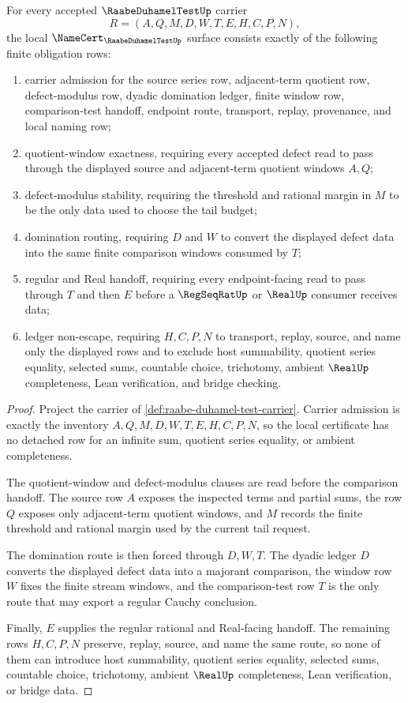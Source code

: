 \begin{theorem}\label{thm:raabe-duhamel-test-namecert-obligations}
For every accepted $\RaabeDuhamelTestUp$ carrier
$$
R=(A,Q,M,D,W,T,E,H,C,P,N),
$$
the local $\NameCert_{\RaabeDuhamelTestUp}$ surface consists exactly of the following finite obligation rows:
\begin{enumerate}
\item carrier admission for the source series row, adjacent-term quotient row, defect-modulus row, dyadic domination ledger, finite window row, comparison-test handoff, endpoint route, transport, replay, provenance, and local naming row;
\item quotient-window exactness, requiring every accepted defect read to pass through the displayed source and adjacent-term quotient windows $A,Q$;
\item defect-modulus stability, requiring the threshold and rational margin in $M$ to be the only data used to choose the tail budget;
\item domination routing, requiring $D$ and $W$ to convert the displayed defect data into the same finite comparison windows consumed by $T$;
\item regular and Real handoff, requiring every endpoint-facing read to pass through $T$ and then $E$ before a $\RegSeqRatUp$ or $\RealUp$ consumer receives data;
\item ledger non-escape, requiring $H,C,P,N$ to transport, replay, source, and name only the displayed rows and to exclude host summability, quotient series equality, selected sums, countable choice, trichotomy, ambient $\RealUp$ completeness, Lean verification, and bridge checking.
\end{enumerate}
\end{theorem}
\begin{proof}
Project the carrier of \autoref{def:raabe-duhamel-test-carrier}. Carrier admission is exactly the inventory $A,Q,M,D,W,T,E,H,C,P,N$, so the local certificate has no detached row for an infinite sum, quotient series equality, or ambient completeness.

The quotient-window and defect-modulus clauses are read before the comparison handoff. The source row $A$ exposes the inspected terms and partial sums, the row $Q$ exposes only adjacent-term quotient windows, and $M$ records the finite threshold and rational margin used by the current tail request.

The domination route is then forced through $D,W,T$. The dyadic ledger $D$ converts the displayed defect data into a majorant comparison, the window row $W$ fixes the finite stream windows, and the comparison-test row $T$ is the only route that may export a regular Cauchy conclusion.

Finally, $E$ supplies the regular rational and Real-facing handoff. The remaining rows $H,C,P,N$ preserve, replay, source, and name the same route, so none of them can introduce host summability, quotient series equality, selected sums, countable choice, trichotomy, ambient $\RealUp$ completeness, Lean verification, or bridge data.
\end{proof}

